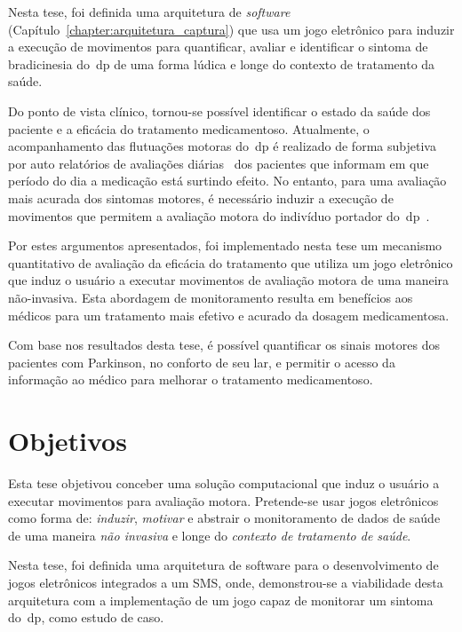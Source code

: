 Nesta tese, foi definida uma arquitetura de \textit{software} (Capítulo~\ref{chapter:arquitetura_captura}) que usa um jogo eletrônico para induzir a execução de movimentos para quantificar, avaliar e identificar o sintoma de bradicinesia do~\ac{dp} de uma forma lúdica e longe do contexto de tratamento da saúde.

Do ponto de vista clínico, tornou-se possível identificar o estado da saúde dos paciente e a eficácia do tratamento medicamentoso. Atualmente, o acompanhamento das flutuações motoras do~\ac{dp} é realizado de forma subjetiva por auto relatórios de avaliações diárias~\cite{parkself2015,reviewassesenspark2015} dos pacientes que informam em que período do dia a medicação está surtindo efeito. No entanto, para uma avaliação mais acurada dos sintomas motores, é necessário induzir a execução de movimentos que permitem a avaliação motora do indivíduo portador do~\ac{dp}~\cite{wiiassesspark2016}.

Por estes argumentos apresentados, foi implementado nesta tese um mecanismo quantitativo de avaliação da eficácia do tratamento que utiliza um jogo eletrônico que induz o usuário a executar movimentos de avaliação motora de uma maneira não-invasiva. Esta abordagem de monitoramento resulta em benefícios aos médicos para um tratamento mais efetivo e acurado da dosagem medicamentosa. 

Com base nos resultados desta tese, é possível quantificar os sinais motores dos pacientes com Parkinson, no conforto de seu lar, e permitir o acesso da informação ao médico para melhorar o tratamento medicamentoso.

\section{Objetivos}\label{section:objetivos}
Esta tese objetivou conceber uma solução computacional que induz o usuário a executar movimentos para avaliação motora. Pretende-se usar jogos eletrônicos como forma de: \textit{induzir}, \textit{motivar} e abstrair o monitoramento de dados de saúde de uma maneira \textit{não invasiva} e longe do \textit{contexto de tratamento de saúde}.

Nesta tese, foi definida uma arquitetura de software para o desenvolvimento de jogos eletrônicos integrados a um SMS, onde, demonstrou-se a viabilidade desta arquitetura com a implementação de um jogo capaz de monitorar um sintoma do~\ac{dp}, como estudo de caso.


